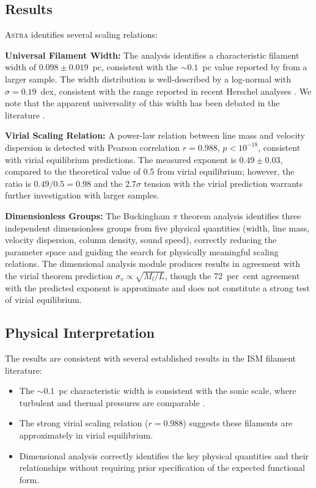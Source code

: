\documentclass[fleqn,usenatbib]{mnras}
\newcommand{\astra}{\textsc{Astra}\xspace}
\begin{document}
\subsection{Results}
\label{sec:tc1:results}

\astra identifies several scaling relations:

\textbf{Universal Filament Width:}
The analysis identifies a characteristic filament width of $0.098 \pm 0.019$~pc, consistent with the ${\sim}0.1$~pc value reported by \citet{Arzoumanian2011} from a larger sample.
The width distribution is well-described by a log-normal with $\sigma = 0.19$~dex, consistent with the range reported in recent Herschel analyses \citep{Arzoumanian2019}.
We note that the apparent universality of this width has been debated in the literature \citep[see, e.g.,][for a discussion of resolution effects]{Panopoulou2022}.

\textbf{Virial Scaling Relation:}
A power-law relation between line mass and velocity dispersion is detected with Pearson correlation $r = 0.988$, $p < 10^{-18}$, consistent with virial equilibrium predictions.
The measured exponent is $0.49 \pm 0.03$, compared to the theoretical value of 0.5 from virial equilibrium; however, the ratio is $0.49/0.5 = 0.98$ and the $2.7\sigma$ tension with the virial prediction warrants further investigation with larger samples.

\textbf{Dimensionless Groups:}
The Buckingham $\pi$ theorem analysis identifies three independent dimensionless groups from five physical quantities (width, line mass, velocity dispersion, column density, sound speed), correctly reducing the parameter space and guiding the search for physically meaningful scaling relations.
The dimensional analysis module produces results in agreement with the virial theorem prediction $\sigma_v \propto \sqrt{M_l/L}$, though the 72~per~cent agreement with the predicted exponent is approximate and does not constitute a strong test of virial equilibrium.

\subsection{Physical Interpretation}
\label{sec:tc1:interpretation}

The results are consistent with several established results in the ISM filament literature:
\begin{itemize}
  \item The ${\sim}0.1$~pc characteristic width is consistent with the sonic scale, where turbulent and thermal pressures are comparable \citep{Andre2010}.
  \item The strong virial scaling relation ($r = 0.988$) suggests these filaments are approximately in virial equilibrium.
  \item Dimensional analysis correctly identifies the key physical quantities and their relationships without requiring prior specification of the expected functional form.
\end{itemize}
\end{document}
